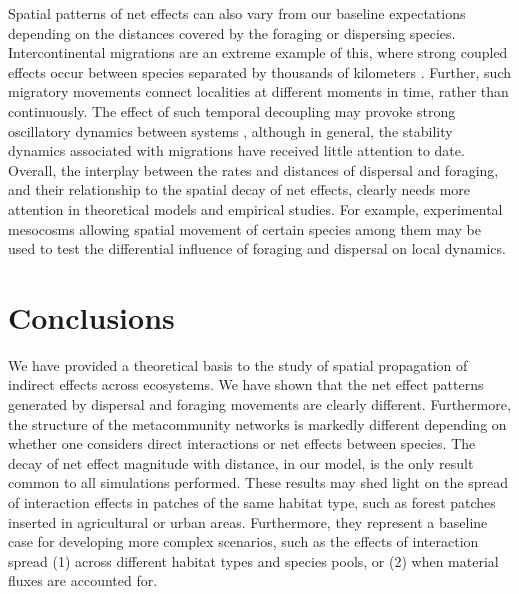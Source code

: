 Spatial patterns of net effects can also vary from our baseline expectations depending on the distances covered by the foraging or dispersing species. Intercontinental migrations are an extreme example of this, where strong coupled effects occur between species separated by thousands of kilometers \citep{Alerstam2018}. Further, such migratory movements connect localities at different moments in time, rather than continuously. The effect of such temporal decoupling may provoke strong oscillatory dynamics between systems \citep{Springer2018}, although in general, the stability dynamics associated with migrations have received little attention to date. Overall, the interplay between the rates and distances of dispersal and foraging, and their relationship to the spatial decay of net effects, clearly needs more attention in theoretical models and empirical studies. For example, experimental mesocosms allowing spatial movement of certain species among them may be used to test the differential influence of foraging and dispersal on local dynamics.

\section{Conclusions}

We have provided a theoretical basis to the study of spatial propagation of indirect effects across ecosystems. We have shown that the net effect patterns generated by dispersal and foraging movements are clearly different. Furthermore, the structure of the metacommunity networks is markedly different depending on whether one considers direct interactions or net effects between species. The decay of net effect magnitude with distance, in our model, is the only result common to all simulations performed. These results may shed light on the spread of interaction effects in patches of the same habitat type, such as forest patches inserted in agricultural or urban areas. Furthermore, they represent a baseline case for developing more complex scenarios, such as the effects of interaction spread (1) across different habitat types and species pools, or (2) when material fluxes are accounted for.

